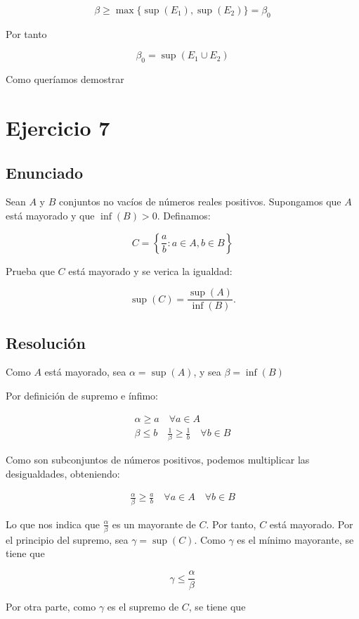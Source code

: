 \documentclass[11pt]{article}
\begin{document}
\[
\beta \geq \max\{\sup(E_1), \sup(E_2)\} = \beta_0
\]

Por tanto

\[
\beta_0 = \sup(E_1 \cup E_2)
\]

Como queríamos demostrar


\section{Ejercicio 7}
\label{sec-3}

\subsection{Enunciado}
\label{sec-3-1}
Sean $A$ y $B$ conjuntos no vacíos de números reales positivos.
Supongamos que $A$ está mayorado y que $\inf(B) > 0$.
Definamos:

\[
C = \left\{\frac{a}{b}: a \in A, b \in B\right\}
\]

Prueba que $C$ está mayorado y se verica la igualdad:

\[
\sup(C) = \frac{\sup(A)}{\inf(B)}.
\]

\subsection{Resolución}
\label{sec-3-2}

Como $A$ está mayorado, sea $\alpha = \sup(A)$, y sea $\beta = \inf(B)$

Por definición de supremo e ínfimo:

\begin{align*}
\alpha \geq a \quad \forall a \in A \\
\beta \leq b \quad \frac{1}{\beta} \geq \frac{1}{b} \quad \forall b \in B
\end{align*}

Como son subconjuntos de números positivos, podemos multiplicar
las desigualdades, obteniendo:

\begin{align}
\frac{\alpha}{\beta} \geq \frac{a}{b} \quad \forall a \in A \quad \forall b \in B
\end{align}

Lo que nos indica que $\frac{\alpha}{\beta}$ es un mayorante de $C$. Por tanto,
$C$ está mayorado. Por el principio del supremo, sea
$\gamma = \sup(C)$. Como $\gamma$ es el mínimo mayorante, se tiene que

\[
\gamma \leq \frac{\alpha}{\beta}
\]

Por otra parte, como $\gamma$ es el supremo de $C$, se tiene
que
\end{document}
